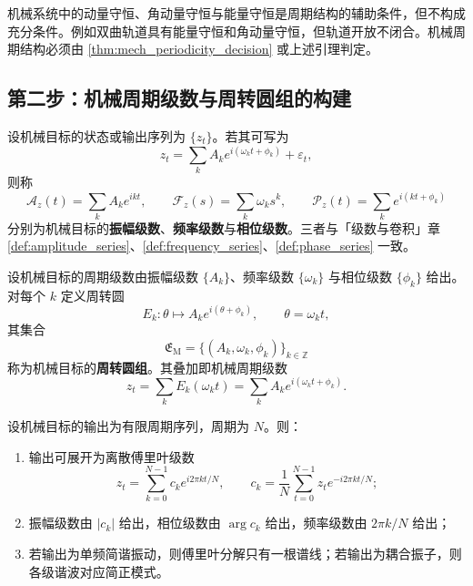 \begin{remark}[守恒量不保证周期]\label{rem:mech_invariant_not_period}
机械系统中的动量守恒、角动量守恒与能量守恒是周期结构的辅助条件，但不构成充分条件。例如双曲轨道具有能量守恒和角动量守恒，但轨道开放不闭合。机械周期结构必须由 \cref{thm:mech_periodicity_decision} 或上述引理判定。
\end{remark}

\subsection{第二步：机械周期级数与周转圆组的构建}

\begin{definition}\label{def:mech_series}
设机械目标的状态或输出序列为 $\{z_t\}$。若其可写为
\[
z_t=\sum_k A_k e^{i(\omega_k t+\phi_k)}+\varepsilon_t,
\]
则称
\[
\mathcal A_z(t)=\sum_k A_k e^{ikt},\qquad
\mathcal F_z(s)=\sum_k \omega_k s^k,\qquad
\mathcal P_z(t)=\sum_k e^{i(kt+\phi_k)}
\]
分别为机械目标的\textbf{振幅级数}、\textbf{频率级数}与\textbf{相位级数}。三者与「级数与卷积」章 \cref{def:amplitude_series}、\cref{def:frequency_series}、\cref{def:phase_series} 一致。
\end{definition}

\begin{definition}[机械周转圆组]\label{def:mech_epicycle_group}
设机械目标的周期级数由振幅级数 $\{A_k\}$、频率级数 $\{\omega_k\}$ 与相位级数 $\{\phi_k\}$ 给出。对每个 $k$ 定义周转圆
\[
E_k:\theta\mapsto A_k e^{i(\theta+\phi_k)},\qquad \theta=\omega_k t,
\]
其集合
\[
\mathfrak E_{\mathrm{M}}=\{(A_k,\omega_k,\phi_k)\}_{k\in\mathbb Z}
\]
称为机械目标的\textbf{周转圆组}。其叠加即机械周期级数
\[
z_t=\sum_k E_k(\omega_k t)=\sum_k A_k e^{i(\omega_k t+\phi_k)}.
\]
\end{definition}

\begin{theorem}[由机械数据构建周期级数]\label{thm:mech_series_reconstruction}
设机械目标的输出为有限周期序列，周期为 $N$。则：
\begin{enumerate}[label=(\roman*)]
    \item 输出可展开为离散傅里叶级数
    \[
    z_t=\sum_{k=0}^{N-1}c_k e^{i2\pi kt/N},\qquad
    c_k=\frac1N\sum_{t=0}^{N-1}z_t e^{-i2\pi kt/N};
    \]
    \item 振幅级数由 $|c_k|$ 给出，相位级数由 $\arg c_k$ 给出，频率级数由 $2\pi k/N$ 给出；
    \item 若输出为单频简谐振动，则傅里叶分解只有一根谱线；若输出为耦合振子，则各级谐波对应简正模式。
\end{enumerate}
\end{theorem}

